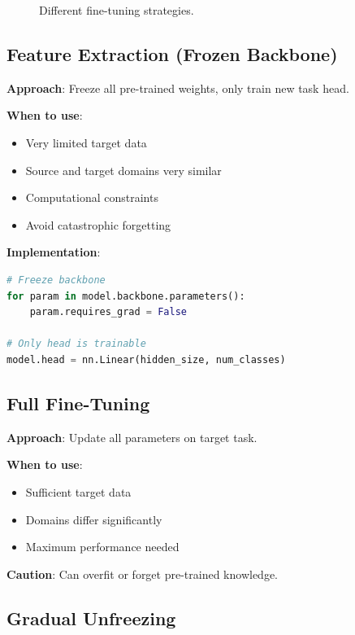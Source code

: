 \begin{figure}[H]
\caption{Different fine-tuning strategies.}
\label{fig:finetuning_strategies}
\end{figure}

\subsection{Feature Extraction (Frozen Backbone)}

\textbf{Approach}: Freeze all pre-trained weights, only train new task head.

\textbf{When to use}:
\begin{itemize}
    \item Very limited target data
    \item Source and target domains very similar
    \item Computational constraints
    \item Avoid catastrophic forgetting
\end{itemize}

\textbf{Implementation}:
\begin{lstlisting}[language=Python]
# Freeze backbone
for param in model.backbone.parameters():
    param.requires_grad = False

# Only head is trainable
model.head = nn.Linear(hidden_size, num_classes)
\end{lstlisting}

\subsection{Full Fine-Tuning}

\textbf{Approach}: Update all parameters on target task.

\textbf{When to use}:
\begin{itemize}
    \item Sufficient target data
    \item Domains differ significantly
    \item Maximum performance needed
\end{itemize}

\textbf{Caution}: Can overfit or forget pre-trained knowledge.

\subsection{Gradual Unfreezing}


